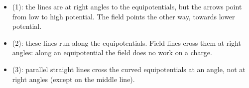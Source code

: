 \begin{abcliste}
\abc
\begin{itemize}
\item (1): the lines are at right angles to the equipotentials, but the arrows point from low to high potential. The field points the other way, towards lower potential.
\item (2): these lines run along the equipotentials. Field lines cross them at right angles: along an equipotential the field does no work on a charge.
\item (3): parallel straight lines cross the curved equipotentials at an angle, not at right angles (except on the middle line).
\end{itemize}
\end{abcliste}
